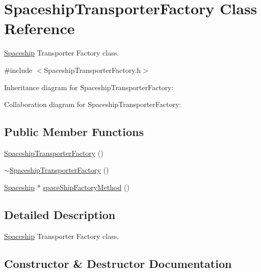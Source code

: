 \hypertarget{classSpaceshipTransporterFactory}{}\section{Spaceship\+Transporter\+Factory Class Reference}
\label{classSpaceshipTransporterFactory}


\hyperlink{classSpaceship}{Spaceship} Transporter Factory class.  




{\ttfamily \#include $<$Spaceship\+Transporter\+Factory.\+h$>$}



Inheritance diagram for Spaceship\+Transporter\+Factory\+:


Collaboration diagram for Spaceship\+Transporter\+Factory\+:
\subsection*{Public Member Functions}
\begin{DoxyCompactItemize}
\item 
\hyperlink{classSpaceshipTransporterFactory_ad11fd5d05b2c26f7d06f20ed50b909e6}{Spaceship\+Transporter\+Factory} ()
\item 
\hyperlink{classSpaceshipTransporterFactory_ae212a0156eeb4517bc8e8f518971eec7}{$\sim$\+Spaceship\+Transporter\+Factory} ()
\item 
\hyperlink{classSpaceship}{Spaceship} $\ast$ \hyperlink{classSpaceshipTransporterFactory_a284f810807dd8ba597ed110b2c72f084}{space\+Ship\+Factory\+Method} ()
\end{DoxyCompactItemize}


\subsection{Detailed Description}
\hyperlink{classSpaceship}{Spaceship} Transporter Factory class. 

\subsection{Constructor \& Destructor Documentation}
\mbox{\label{classSpaceshipTransporterFactory_ad11fd5d05b2c26f7d06f20ed50b909e6}} 
